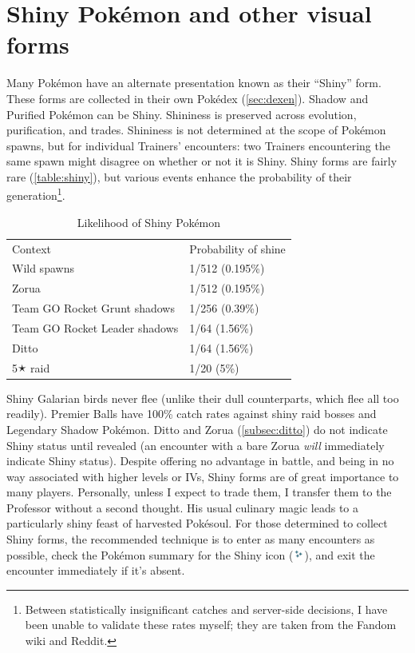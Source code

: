 \section{Shiny Pokémon and other visual forms}
\label{sec:shiny}
Many Pokémon have an alternate presentation known as their ``Shiny'' form.
These forms are collected in their own Pokédex (\autoref{sec:dexen}).
Shadow and Purified Pokémon can be Shiny.
Shininess is preserved across evolution, purification, and trades.
Shininess is not determined at the scope of Pokémon spawns, but for individual
  Trainers' encounters: two Trainers encountering the same spawn might disagree
  on whether or not it is Shiny.
Shiny forms are fairly rare (\autoref{table:shiny}), but various events
  enhance the probability of their generation\footnote{Between statistically insignificant catches and server-side decisions, I have been unable to validate these rates myself; they are taken from the Fandom wiki and Reddit.}.
\begin{table}
\centering
\begin{tabular}{ll}
Context & Probability of shine \\
\Midrule
  Wild spawns & 1/512 (0.195\%) \\
  Zorua & 1/512 (0.195\%) \\
  Team GO Rocket Grunt shadows & 1/256 (0.39\%) \\
  Team GO Rocket Leader shadows & 1/64 (1.56\%) \\
  Ditto & 1/64 (1.56\%)\\
  5🟉 raid & 1/20 (5\%) \\
\end{tabular}
\caption{Likelihood of Shiny Pokémon}
\label{table:shiny}
\end{table}
Shiny Galarian birds never flee (unlike their dull counterparts, which flee all too readily).
Premier Balls have 100\% catch rates against shiny raid bosses and Legendary Shadow Pokémon.
Ditto and Zorua (\autoref{subsec:ditto}) do not indicate Shiny status until revealed (an encounter
  with a bare Zorua \textit{will} immediately indicate Shiny status).
Despite offering no advantage in battle, and being in no way associated with
  higher levels or IVs, Shiny forms are of great importance to many players.
Personally, unless I expect to trade them, I transfer them to the Professor
  without a second thought.
His usual culinary magic leads to a particularly shiny feast of harvested Pokésoul.
For those determined to collect Shiny forms, the recommended technique
  is to enter as many encounters as possible, check the Pokémon summary
  for the Shiny icon (\includegraphics[width=1em,keepaspectratio]{images/shiny.png}),
  and exit the encounter immediately if it's absent.

